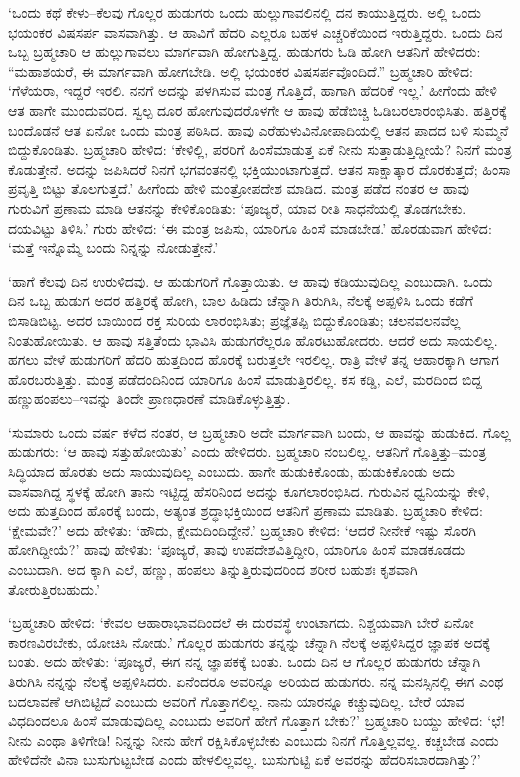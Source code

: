 ‘ಒಂದು ಕಥೆ ಕೇಳು–ಕೆಲವು ಗೊಲ್ಲರ ಹುಡುಗರು ಒಂದು ಹುಲ್ಲುಗಾವಲಿನಲ್ಲಿ ದನ ಕಾಯು\-ತ್ತಿದ್ದರು. ಅಲ್ಲಿ ಒಂದು ಭಯಂಕರ ವಿಷಸರ್ಪ ವಾಸವಾಗಿತ್ತು. ಆ ಹಾವಿಗೆ ಹೆದರಿ ಎಲ್ಲರೂ ಬಹಳ ಎಚ್ಚರಿಕೆಯಿಂದ ಇರುತ್ತಿದ್ದರು. ಒಂದು ದಿನ ಒಬ್ಬ ಬ್ರಹ್ಮಚಾರಿ ಆ ಹುಲ್ಲುಗಾವಲು ಮಾರ್ಗವಾಗಿ ಹೋಗುತ್ತಿದ್ದ. ಹುಡುಗರು ಓಡಿ ಹೋಗಿ ಆತನಿಗೆ ಹೇಳಿದರು: “ಮಹಾಶಯರೆ, ಈ ಮಾರ್ಗವಾಗಿ ಹೋಗಬೇಡಿ. ಅಲ್ಲಿ ಭಯಂಕರ ವಿಷಸರ್ಪವೊಂದಿದೆ.” ಬ್ರಹ್ಮಚಾರಿ ಹೇಳಿದ: ‘ಗೆಳೆಯರಾ, ಇದ್ದರೆ ಇರಲಿ. ನನಗೆ ಅದನ್ನು ಪಳಗಿಸುವ ಮಂತ್ರ ಗೊತ್ತಿದೆ, ಹಾಗಾಗಿ ಹೆದರಿಕೆ ಇಲ್ಲ.’ ಹೀಗೆಂದು ಹೇಳಿ ಆತ ಹಾಗೇ ಮುಂದುವರಿದ. ಸ್ವಲ್ಪ ದೂರ ಹೋಗುವುದರೊಳಗೇ ಆ ಹಾವು ಹೆಡೆಬಿಚ್ಚಿ ಓಡಿಬರಲಾರಂಭಿಸಿತು. ಹತ್ತಿರಕ್ಕೆ ಬಂದೊಡನೆ ಆತ ಏನೋ ಒಂದು ಮಂತ್ರ ಪಠಿಸಿದ. ಹಾವು ಎರೆಹುಳುವಿನೋಪಾದಿಯಲ್ಲಿ ಆತನ ಪಾದದ ಬಳಿ ಸುಮ್ಮನೆ ಬಿದ್ದುಕೊಂಡಿತು. ಬ್ರಹ್ಮಚಾರಿ ಹೇಳಿದ: ‘ಕೇಳಿಲ್ಲಿ, ಪರರಿಗೆ ಹಿಂಸೆಮಾಡುತ್ತ ಏಕೆ ನೀನು ಸುತ್ತಾಡುತ್ತಿದ್ದೀಯೆ? ನಿನಗೆ ಮಂತ್ರ ಕೊಡುತ್ತೇನೆ. ಅದನ್ನು ಜಪಿಸಿದರೆ ನಿನಗೆ ಭಗವಂತನಲ್ಲಿ ಭಕ್ತಿಯುಂಟಾಗುತ್ತದೆ. ಆತನ ಸಾಕ್ಷಾತ್ಕಾರ ದೊರಕುತ್ತದೆ; ಹಿಂಸಾ ಪ್ರವೃತ್ತಿ ಬಿಟ್ಟು ತೊಲಗುತ್ತದೆ.’ ಹೀಗೆಂದು ಹೇಳಿ ಮಂತ್ರೋಪದೇಶ ಮಾಡಿದ. ಮಂತ್ರ ಪಡೆದ ನಂತರ ಆ ಹಾವು ಗುರುವಿಗೆ ಪ್ರಣಾಮ ಮಾಡಿ ಆತನನ್ನು ಕೇಳಿಕೊಂಡಿತು: ‘ಪೂಜ್ಯರೆ, ಯಾವ ರೀತಿ ಸಾಧನೆಯಲ್ಲಿ ತೊಡಗಬೇಕು. ದಯವಿಟ್ಟು ತಿಳಿಸಿ.’ ಗುರು ಹೇಳಿದ: ‘ಈ ಮಂತ್ರ ಜಪಿಸು, ಯಾರಿಗೂ ಹಿಂಸೆ ಮಾಡಬೇಡ.’ ಹೊರಡುವಾಗ ಹೇಳಿದ: ‘ಮತ್ತೆ ಇನ್ನೊಮ್ಮೆ ಬಂದು ನಿನ್ನನ್ನು ನೋಡುತ್ತೇನೆ.’

‘ಹಾಗೆ ಕೆಲವು ದಿನ ಉರುಳಿದವು. ಆ ಹುಡುಗರಿಗೆ ಗೊತ್ತಾಯಿತು. ಆ ಹಾವು ಕಡಿಯುವು\-ದಿಲ್ಲ ಎಂಬುದಾಗಿ. ಒಂದು ದಿನ ಒಬ್ಬ ಹುಡುಗ ಅದರ ಹತ್ತಿರಕ್ಕೆ ಹೋಗಿ, ಬಾಲ ಹಿಡಿದು ಚೆನ್ನಾಗಿ ತಿರುಗಿಸಿ, ನೆಲಕ್ಕೆ ಅಪ್ಪಳಿಸಿ ಒಂದು ಕಡೆಗೆ ಬಿಸಾಡಿಬಿಟ್ಟ. ಅದರ ಬಾಯಿಂದ ರಕ್ತ ಸುರಿಯ ಲಾರಂಭಿಸಿತು; ಪ್ರಜ್ಞೆತಪ್ಪಿ ಬಿದ್ದುಕೊಂಡಿತು; ಚಲನವಲನವೆಲ್ಲ ನಿಂತುಹೋಯಿತು. ಆ ಹಾವು ಸತ್ತಿತೆಂದು ಭಾವಿಸಿ ಹುಡುಗರೆಲ್ಲರೂ ಹೊರಟುಹೋದರು. ಆದರೆ ಅದು ಸಾಯಲಿಲ್ಲ. ಹಗಲು ವೇಳೆ ಹುಡುಗರಿಗೆ ಹೆದರಿ ಹುತ್ತದಿಂದ ಹೊರಕ್ಕೆ ಬರುತ್ತಲೇ ಇರಲಿಲ್ಲ. ರಾತ್ರಿ ವೇಳೆ ತನ್ನ ಆಹಾರಕ್ಕಾಗಿ ಆಗಾಗ ಹೊರಬರುತ್ತಿತ್ತು. ಮಂತ್ರ ಪಡೆದಂದಿನಿಂದ ಯಾರಿಗೂ ಹಿಂಸೆ ಮಾಡುತ್ತಿರಲಿಲ್ಲ. ಕಸ ಕಡ್ಡಿ, ಎಲೆ, ಮರದಿಂದ ಬಿದ್ದ ಹಣ್ಣುಹಂಪಲು–ಇವನ್ನು ತಿಂದೇ ಪ್ರಾಣಧಾರಣೆ ಮಾಡಿಕೊಳ್ಳುತ್ತಿತ್ತು.

\newpage

‘ಸುಮಾರು ಒಂದು ವರ್ಷ ಕಳೆದ ನಂತರ, ಆ ಬ್ರಹ್ಮಚಾರಿ ಅದೇ ಮಾರ್ಗವಾಗಿ ಬಂದು, ಆ ಹಾವನ್ನು ಹುಡುಕಿದ. ಗೊಲ್ಲ ಹುಡುಗರು: ‘ಆ ಹಾವು ಸತ್ತುಹೋಯಿತು’ ಎಂದು ಹೇಳಿದರು. ಬ್ರಹ್ಮಚಾರಿ ನಂಬಲಿಲ್ಲ. ಆತನಿಗೆ ಗೊತ್ತಿತ್ತು–ಮಂತ್ರ ಸಿದ್ಧಿಯಾದ ಹೊರತು ಅದು ಸಾಯುವು\-ದಿಲ್ಲ ಎಂಬುದು. ಹಾಗೇ ಹುಡುಕಿಕೊಂಡು, ಹುಡುಕಿಕೊಂಡು ಅದು ವಾಸವಾಗಿದ್ದ ಸ್ಥಳಕ್ಕೆ ಹೋಗಿ ತಾನು ಇಟ್ಟಿದ್ದ ಹೆಸರಿನಿಂದ ಅದನ್ನು ಕೂಗಲಾರಂಭಿಸಿದ. ಗುರುವಿನ ಧ್ವನಿಯನ್ನು ಕೇಳಿ, ಅದು ಹುತ್ತದಿಂದ ಹೊರಕ್ಕೆ ಬಂದು, ಅತ್ಯಂತ ಶ್ರದ್ಧಾಭಕ್ತಿಯಿಂದ ಆತನಿಗೆ ಪ್ರಣಾಮ ಮಾಡಿತು. ಬ್ರಹ್ಮಚಾರಿ ಕೇಳಿದ: ‘ಕ್ಷೇಮವೇ?’ ಅದು ಹೇಳಿತು: ‘ಹೌದು, ಕ್ಷೇಮದಿಂದಿದ್ದೇನೆ.’ ಬ್ರಹ್ಮಚಾರಿ ಕೇಳಿದ: ‘ಆದರೆ ನೀನೇಕೆ ಇಷ್ಟು ಸೊರಗಿ ಹೋಗಿದ್ದೀಯೆ?’ ಹಾವು ಹೇಳಿತು: ‘ಪೂಜ್ಯರೆ, ತಾವು ಉಪದೇಶವಿತ್ತಿದ್ದೀರಿ, ಯಾರಿಗೂ ಹಿಂಸೆ ಮಾಡಕೂಡದು ಎಂಬುದಾಗಿ. ಅದ ಕ್ಕಾಗಿ ಎಲೆ, ಹಣ್ಣು, ಹಂಪಲು ತಿನ್ನುತ್ತಿರುವುದರಿಂದ ಶರೀರ ಬಹುಶಃ ಕೃಶವಾಗಿ ತೋರುತ್ತಿರಬಹುದು.’

‘ಬ್ರಹ್ಮಚಾರಿ ಹೇಳಿದ: ‘ಕೇವಲ ಆಹಾರಾಭಾವದಿಂದಲೆ ಈ ದುರವಸ್ಥೆ ಉಂಟಾಗದು. ನಿಶ್ಚಯವಾಗಿ ಬೇರೆ ಏನೋ ಕಾರಣವಿರಬೇಕು, ಯೋಚಿಸಿ ನೋಡು.’ ಗೊಲ್ಲರ ಹುಡುಗರು ತನ್ನನ್ನು ಚೆನ್ನಾಗಿ ನೆಲಕ್ಕೆ ಅಪ್ಪಳಿಸಿದ್ದರ ಜ್ಞಾಪಕ ಅದಕ್ಕೆ ಬಂತು. ಅದು ಹೇಳಿತು: ‘ಪೂಜ್ಯರೆ, ಈಗ ನನ್ನ ಜ್ಞಾಪಕಕ್ಕೆ ಬಂತು. ಒಂದು ದಿನ ಆ ಗೊಲ್ಲರ ಹುಡುಗರು ಚೆನ್ನಾಗಿ ತಿರುಗಿಸಿ ನನ್ನನ್ನು ನೆಲಕ್ಕೆ ಅಪ್ಪಳಿಸಿದರು. ಏನೆಂದರೂ ಅವರಿನ್ನೂ ಅರಿಯದ ಹುಡುಗರು. ನನ್ನ ಮನಸ್ಸಿನಲ್ಲಿ ಈಗ ಎಂಥ ಬದಲಾವಣೆ ಆಗಿಬಿಟ್ಟಿದೆ ಎಂಬುದು ಅವರಿಗೆ ಗೊತ್ತಾಗಲಿಲ್ಲ. ನಾನು ಯಾರನ್ನೂ ಕಚ್ಚುವುದಿಲ್ಲ. ಬೇರೆ ಯಾವ ವಿಧದಿಂದಲೂ ಹಿಂಸೆ ಮಾಡುವುದಿಲ್ಲ ಎಂಬುದು ಅವರಿಗೆ ಹೇಗೆ ಗೊತ್ತಾಗ ಬೇಕು?’ ಬ್ರಹ್ಮಚಾರಿ ಬಯ್ದು ಹೇಳಿದ: ‘ಛೆ! ನೀನು ಎಂಥಾ ತಿಳಿಗೇಡಿ! ನಿನ್ನನ್ನು ನೀನು ಹೇಗೆ ರಕ್ಷಿಸಿಕೊಳ್ಳಬೇಕು ಎಂಬುದು ನಿನಗೆ ಗೊತ್ತಿಲ್ಲವಲ್ಲ. ಕಚ್ಚಬೇಡ ಎಂದು ಹೇಳಿದೆನೇ ವಿನಾ ಬುಸುಗುಟ್ಟಬೇಡ ಎಂದು ಹೇಳಲಿಲ್ಲವಲ್ಲ. ಬುಸುಗುಟ್ಟಿ ಏಕೆ ಅವರನ್ನು ಹೆದರಿಸಬಾರದಾಗಿತ್ತು?’

